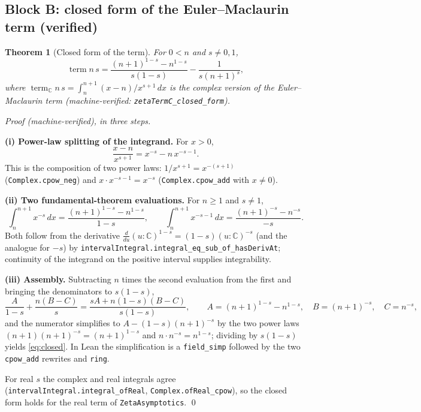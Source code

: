 \documentclass{article}
\newtheorem{theorem}{Theorem}[section]
\newcommand{\C}{\mathbb{C}}
\begin{document}
\subsection{Block B: closed form of the Euler--Maclaurin term (verified)}
\label{sec:blockB}

\begin{theorem}[Closed form of the term]
\label{thm:closed}
For $0<n$ and $s\neq 0,1$,
\begin{equation}
\label{eq:closed}
\operatorname{term} n\,s
=\frac{(n+1)^{1-s}-n^{1-s}}{s(1-s)}-\frac{1}{s(n+1)^s},
\end{equation}
where $\operatorname{term}_{\C} n\,s=\int_n^{n+1}(x-n)/x^{s+1}\,dx$ is the
complex version of the Euler--Maclaurin term
(machine-verified: \texttt{zetaTermC\_closed\_form}).
\end{theorem}

\emph{Proof (machine-verified), in three steps.}

\textbf{(i) Power-law splitting of the integrand.} For $x>0$,
\[
\frac{x-n}{x^{s+1}}=x^{-s}-n\,x^{-s-1}.
\]
This is the composition of two power laws: $1/x^{s+1}=x^{-(s+1)}$
(\texttt{Complex.cpow\_neg}) and $x\cdot x^{-s-1}=x^{-s}$
(\texttt{Complex.cpow\_add} with $x\neq 0$).

\textbf{(ii) Two fundamental-theorem evaluations.} For $n\ge 1$ and
$s\neq 1$,
\[
\int_n^{n+1}x^{-s}\,dx=\frac{(n+1)^{1-s}-n^{1-s}}{1-s},
\qquad
\int_n^{n+1}x^{-s-1}\,dx=\frac{(n+1)^{-s}-n^{-s}}{-s}.
\]
Both follow from the derivative
$\frac{d}{du}(u:\C)^{1-s}=(1-s)(u:\C)^{-s}$ (and the analogue for
$-s$) by \texttt{intervalIntegral.integral\_eq\_sub\_of\_hasDerivAt};
continuity of the integrand on the positive interval supplies
integrability.

\textbf{(iii) Assembly.} Subtracting $n$ times the second evaluation from
the first and bringing the denominators to $s(1-s)$,
\[
\frac{A}{1-s}+\frac{n(B-C)}{s}=\frac{sA+n(1-s)(B-C)}{s(1-s)},
\qquad
A=(n+1)^{1-s}-n^{1-s},\quad B=(n+1)^{-s},\quad C=n^{-s},
\]
and the numerator simplifies to $A-(1-s)(n+1)^{-s}$ by the two power laws
$(n+1)(n+1)^{-s}=(n+1)^{1-s}$ and $n\cdot n^{-s}=n^{1-s}$; dividing by
$s(1-s)$ yields \eqref{eq:closed}. In Lean the simplification is a
\texttt{field\_simp} followed by the two \texttt{cpow\_add} rewrites and
\texttt{ring}.

For real $s$ the complex and real integrals agree
(\texttt{intervalIntegral.integral\_ofReal},
\texttt{Complex.ofReal\_cpow}), so the closed form holds for the real term
of \texttt{ZetaAsymptotics}.
\qed
\end{document}
